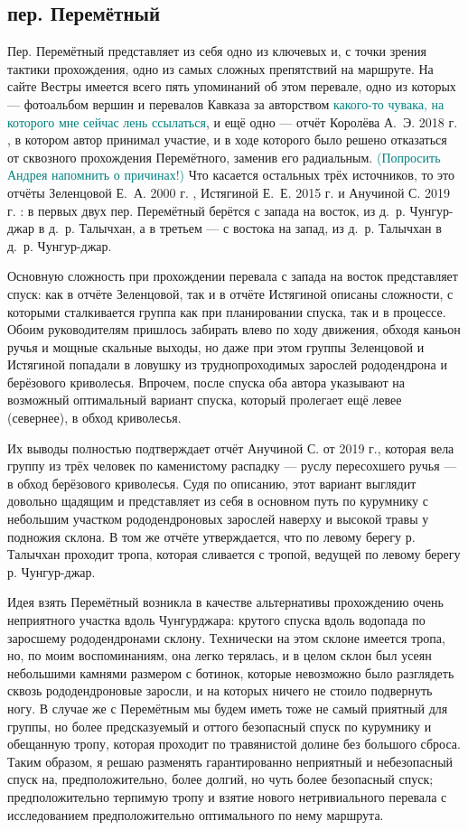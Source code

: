\subsection{пер. Перемётный} 
Пер. Перемётный представляет из себя одно из ключевых и, с точки зрения тактики прохождения, одно из самых сложных препятствий на маршруте. На сайте Вестры \cite{WestraCat} имеется всего пять упоминаний об этом перевале, одно из которых — фотоальбом вершин и перевалов Кавказа за авторством \textcolor{teal}{какого-то чувака, на которого мне сейчас лень ссылаться}, и ещё одно — отчёт Королёва А.~Э. 2018 г. \cite{Korolyov2018}, в котором автор принимал участие, и в ходе которого было решено отказаться от сквозного прохождения Перемётного, заменив его радиальным. \textcolor{teal}{(Попросить Андрея напомнить о причинах!)} Что касается остальных трёх источников, то это отчёты Зеленцовой Е.~А. 2000 г. \cite{Zelentsova2000}, Истягиной Е.~Е. 2015 г. и Анучиной С. 2019 г. \cite{Anuchina2019}: в первых двух пер. Перемётный берётся с запада на восток, из д.~р. Чунгур-джар в д.~р. Талычхан, а в третьем --- с востока на запад, из д.~р. Талычхан в д.~р. Чунгур-джар. 

Основную сложность при прохождении перевала с запада на восток представляет спуск: как в отчёте Зеленцовой, так и в отчёте Истягиной описаны сложности, с которыми сталкивается группа как при планировании спуска, так и в процессе. Обоим руководителям пришлось забирать влево по ходу движения, обходя каньон ручья и мощные скальные выходы, но даже при этом группы Зеленцовой и Истягиной попадали в ловушку из труднопроходимых зарослей рододендрона и берёзового криволесья. Впрочем, после спуска оба автора указывают на возможный оптимальный вариант спуска, который пролегает ещё левее (севернее), в обход криволесья. 

Их выводы полностью подтверждает отчёт Анучиной С. от 2019 г., которая вела группу из трёх человек по каменистому распадку --- руслу пересохшего ручья --- в обход берёзового криволесья. Судя по описанию, этот вариант выглядит довольно щадящим и представляет из себя в основном путь по курумнику с небольшим участком рододендроновых зарослей наверху и высокой травы у подножия склона. В том же отчёте утверждается, что по левому берегу р. Талычхан проходит тропа, которая сливается с тропой, ведущей по левому берегу р. Чунгур-джар. 

Идея взять Перемётный возникла в качестве альтернативы прохождению очень неприятного участка вдоль Чунгурджара: крутого спуска вдоль водопада по заросшему рододендронами склону. Технически на этом склоне имеется тропа, но, по моим воспоминаниям, она легко терялась, и в целом склон был усеян небольшими камнями размером с ботинок, которые невозможно было разглядеть сквозь рододендроновые заросли, и на которых ничего не стоило подвернуть ногу. В случае же с Перемётным мы будем иметь тоже не самый приятный для группы, но более предсказуемый и оттого безопасный спуск по курумнику и обещанную тропу, которая проходит по травянистой долине без большого сброса. Таким образом, я решаю разменять гарантированно неприятный и небезопасный спуск на, предположительно, более долгий, но чуть более безопасный спуск; предположительно терпимую тропу и взятие нового нетривиального перевала с исследованием предположительно оптимального по нему маршрута.